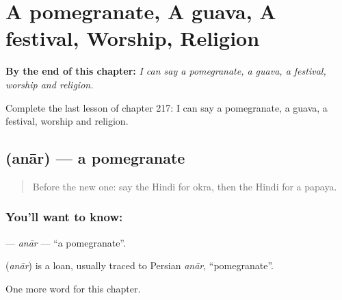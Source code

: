 
\chapter{A pomegranate, A guava, A festival, Worship, Religion}
\label{ch:hi-a-pomegranate-a-guava-a-festival-worship-religion}

\begin{chapteropening}
\textbf{By the end of this chapter:} \emph{I can say a pomegranate, a guava, a festival, worship and religion.}

Complete the last lesson of chapter 217: I can say a pomegranate, a guava, a festival, worship and religion.
\end{chapteropening}

\section[\texorpdfstring{\hi{अनार} (anār)}{अनार (anār)}]{ (anār) — a pomegranate}

\label{lesson:HI-C217-anar}



\begin{quote}
Before the new one: say the Hindi for okra, then the Hindi for a papaya.
\end{quote}

\subsection*{You'll want to know: }
\textbf{} — \emph{anār} — \textquotedblleft{}a pomegranate\textquotedblright{}.

\begin{cousinweb}
\textbf{} (\emph{anār}) is a loan, usually traced to Persian \emph{anār}, \textquotedblleft{}pomegranate\textquotedblright{}.
\end{cousinweb}

\begin{grammarlens}[title={What you've built}]
One more word for this chapter.
\end{grammarlens}

